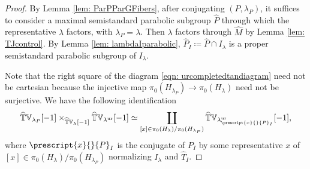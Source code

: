 \documentclass{amsart}
\theoremstyle{definition}
\theoremstyle{remark}
\numberwithin{equation}{section}
\newcommand{\co}[1]{\prescript{#1}{}}
\newcommand{\wh}{\widehat}
\newcommand{\ur}{\mathrm{ur}}
\newcommand{\V}{\mathbb{V}}
\newcommand{\T}{\mathbb{T}}
\begin{document}
\begin{proof}
By Lemma \ref{lem: ParPParGFibers}, after conjugating $(P, \lambda_P)$, it suffices to consider a maximal semistandard parabolic subgroup $\wh P$ through which the representative $\lambda$ factors, with $\lambda_P=\lambda$. Then $\lambda$ factors through $\wh M$ by Lemma \ref{lem: TJcontrol}. By Lemma \ref{lem: lambdaIparabolic}, $\wh P_I\coloneq \wh P\cap I_\lambda$ is a proper semistandard parabolic subgroup of $I_\lambda$. 

Note that the right square of the diagram \eqref{eqn: urcompletedtandiagram} need not be cartesian because the injective map $\pi_0(H_{\lambda_P}) \rightarrow \pi_0(H_{\lambda})$ need not be surjective. We have the following identification
\begin{equation*}
    \wh{\T}\V_{\lambda_P}[-1] \times_{\wh{\T}\V_{\lambda}[-1]} \wh{\T}\V_{\lambda^{\ur}}[-1]  \simeq \coprod\limits_{[x] \in \pi_0(H_{\lambda}) / \pi_0(H_{\lambda_P})} \wh{\T}\V_{\lambda_{\co{x}{P}_I}^{\ur}}[-1],
\end{equation*}
where $\co{x}{P}_I$ is the conjugate of $P_I$ by some representative $x$ of $[x] \in \pi_0(H_{\lambda}) / \pi_0(H_{\lambda_P})$ normalizing $I_\lambda$ and $\wh{T}_I$.


\end{proof}
\end{document}
